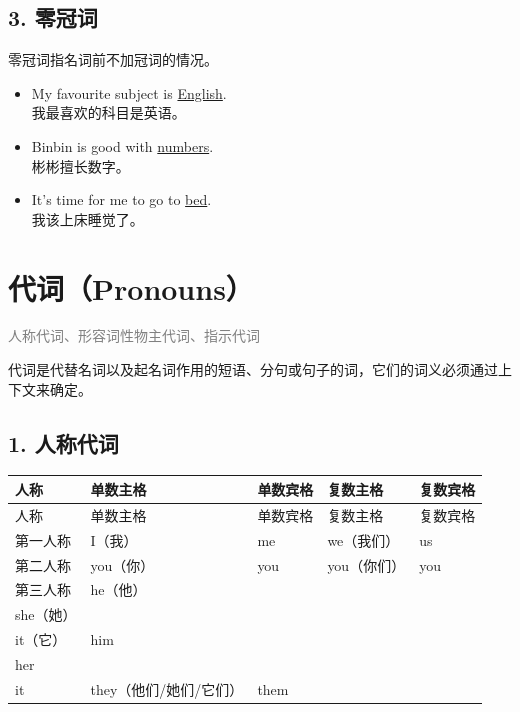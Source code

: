 \documentclass[11pt,a4paper]{ctexart}
\begin{document}
\subsection*{3. 零冠词}

零冠词指名词前不加冠词的情况。

\begin{itemize}[leftmargin=1.4em]
\item My favourite subject is \underline{English}.\\ 我最喜欢的科目是英语。
\item Binbin is good with \underline{numbers}.\\ 彬彬擅长数字。
\item It’s time for me to go to \underline{bed}.\\ 我该上床睡觉了。
\end{itemize}

\begin{center}\end{center}

\section{代词（Pronouns）}
\noindent\textcolor{gray}{人称代词、形容词性物主代词、指示代词}\par\smallskip
代词是代替名词以及起名词作用的短语、分句或句子的词，它们的词义必须通过上下文来确定。

\subsection*{1. 人称代词}

{\footnotesize
\begin{longtable}{p{2.68cm}p{2.68cm}p{2.68cm}p{2.68cm}p{2.68cm}}
\hline
人称 & 单数主格 & 单数宾格 & 复数主格 & 复数宾格 \\
\hline
\endfirsthead
\hline
人称 & 单数主格 & 单数宾格 & 复数主格 & 复数宾格 \\
\hline
\endhead
\hline
\endfoot
第一人称 & I（我） & me & we（我们） & us \\
第二人称 & you（你） & you & you（你们） & you \\
第三人称 & he（他）\\ she（她）\\ it（它） & him\\ her\\ it & they（他们/她们/它们） & them \\
\end{longtable}
}
\end{document}
